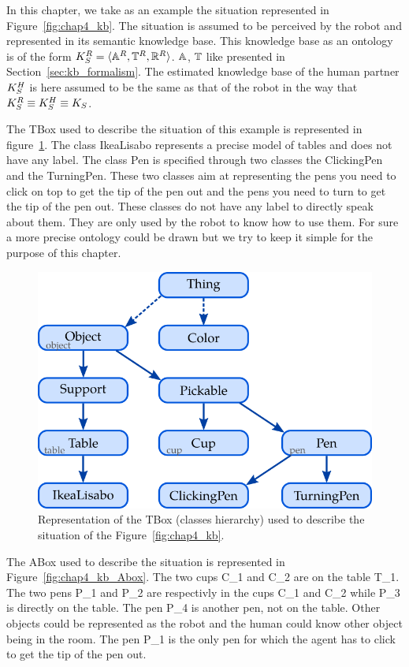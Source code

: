 In this chapter, we take as an example the situation represented in Figure~\ref{fig:chap4_kb}. The situation is assumed to be perceived by the robot and represented in its semantic knowledge base. This knowledge base as an ontology is of the form $K_S^R = \langle \mathbb{A}^R, \mathbb{T}^R, \mathbb{R}^R \rangle$. $\mathbb{A}$, $\mathbb{T}$ like presented in Section~\ref{sec:kb_formalism}. The estimated knowledge base of the human partner $K_S^H$ is here assumed to be the same as that of the robot in the way that $K_S^R \equiv K_S^H \equiv K_S$.

The TBox used to describe the situation of this example is represented in figure~\ref{fig:chap4_kb_Tbox}. The class IkeaLisabo represents a precise model of tables and does not have any label. The class Pen is specified through two classes the ClickingPen and the TurningPen. These two classes aim at representing the pens you need to click on top to get the tip of the pen out and the pens you need to turn to get the tip of the pen out. These classes do not have any label to directly speak about them. They are only used by the robot to know how to use them. For sure a more precise ontology could be drawn but we try to keep it simple for the purpose of this chapter.

\begin{figure}[ht!]
\centering
\includegraphics[scale=0.4]{figures/chapter4/pens_Tbox.png}
\caption{\label{fig:chap4_kb_Tbox} Representation of the TBox (classes hierarchy) used to describe the situation of the Figure~\ref{fig:chap4_kb}. }
\end{figure}

The ABox used to describe the situation is represented in Figure~\ref{fig:chap4_kb_Abox}. The two cups C\_1 and C\_2 are on the table T\_1. The two pens P\_1 and P\_2 are respectivly in the cups C\_1 and C\_2 while P\_3 is directly on the table. The pen P\_4 is another pen, not on the table. Other objects could be represented as the robot and the human could know other object being in the room. The pen P\_1 is the only pen for which the agent has to click to get the tip of the pen out.

